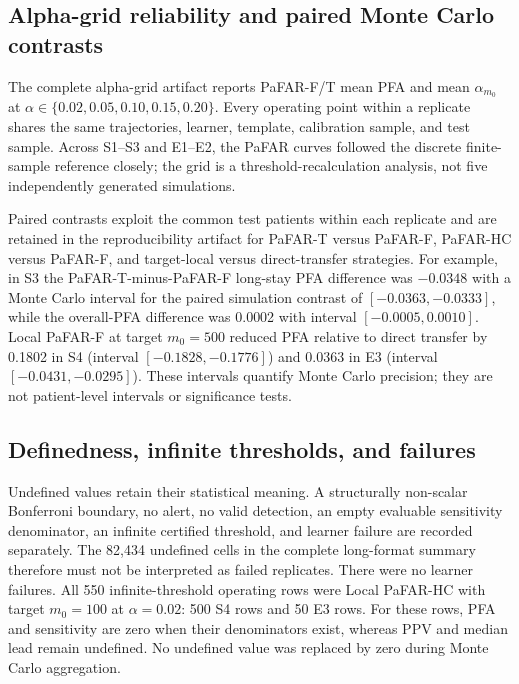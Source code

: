 \documentclass[11pt]{article}
\begin{document}


\subsection{Alpha-grid reliability and paired Monte Carlo contrasts}

The complete alpha-grid artifact reports PaFAR-F/T mean PFA and mean $\alpha_{m_0}$ at $\alpha\in\{0.02,0.05,0.10,0.15,0.20\}$. Every operating point within a replicate shares the same trajectories, learner, template, calibration sample, and test sample. Across S1--S3 and E1--E2, the PaFAR curves followed the discrete finite-sample reference closely; the grid is a threshold-recalculation analysis, not five independently generated simulations.

Paired contrasts exploit the common test patients within each replicate and are retained in the reproducibility artifact for PaFAR-T versus PaFAR-F, PaFAR-HC versus PaFAR-F, and target-local versus direct-transfer strategies. For example, in S3 the PaFAR-T-minus-PaFAR-F long-stay PFA difference was $-0.0348$ with a Monte Carlo interval for the paired simulation contrast of $[-0.0363,-0.0333]$, while the overall-PFA difference was 0.0002 with interval $[-0.0005,0.0010]$. Local PaFAR-F at target $m_0=500$ reduced PFA relative to direct transfer by 0.1802 in S4 (interval $[-0.1828,-0.1776]$) and 0.0363 in E3 (interval $[-0.0431,-0.0295]$). These intervals quantify Monte Carlo precision; they are not patient-level intervals or significance tests.

\subsection{Definedness, infinite thresholds, and failures}

Undefined values retain their statistical meaning. A structurally non-scalar Bonferroni boundary, no alert, no valid detection, an empty evaluable sensitivity denominator, an infinite certified threshold, and learner failure are recorded separately. The 82,434 undefined cells in the complete long-format summary therefore must not be interpreted as failed replicates. There were no learner failures. All 550 infinite-threshold operating rows were Local PaFAR-HC with target $m_0=100$ at $\alpha=0.02$: 500 S4 rows and 50 E3 rows. For these rows, PFA and sensitivity are zero when their denominators exist, whereas PPV and median lead remain undefined. No undefined value was replaced by zero during Monte Carlo aggregation.



\end{document}

